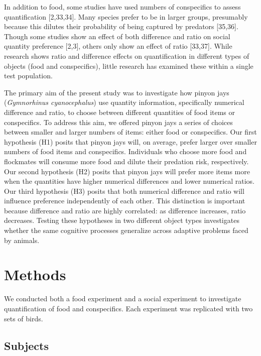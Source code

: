 \documentclass[
  ,doc,floatsintext]{apa6}
\begin{document}
In addition to food, some studies have used numbers of conspecifics to assess quantification {[}2,33,34{]}. Many species prefer to be in larger groups, presumably because this dilutes their probability of being captured by predators {[}35,36{]}. Though some studies show an effect of both difference and ratio on social quantity preference {[}2,3{]}, others only show an effect of ratio {[}33,37{]}. While research shows ratio and difference effects on quantification in different types of objects (food and conspecifics), little research has examined these within a single test population.

The primary aim of the present study was to investigate how pinyon jays (\emph{Gymnorhinus cyanocephalus}) use quantity information, specifically numerical difference and ratio, to choose between different quantities of food items or conspecifics. To address this aim, we offered pinyon jays a series of choices between smaller and larger numbers of items: either food or conspecifics. Our first hypothesis (H1) posits that pinyon jays will, on average, prefer larger over smaller numbers of food items and conspecifics. Individuals who choose more food and flockmates will consume more food and dilute their predation risk, respectively. Our second hypothesis (H2) posits that pinyon jays will prefer more items more when the quantities have higher numerical differences and lower numerical ratios. Our third hypothesis (H3) posits that both numerical difference and ratio will influence preference independently of each other. This distinction is important because difference and ratio are highly correlated: as difference increases, ratio decreases. Testing these hypotheses in two different object types investigates whether the same cognitive processes generalize across adaptive problems faced by animals.

\hypertarget{methods}{%
\section{Methods}\label{methods}}

We conducted both a food experiment and a social experiment to investigate quantification of food and conspecifics. Each experiment was replicated with two sets of birds.

\hypertarget{subjects}{%
\subsection{Subjects}\label{subjects}}
\end{document}
